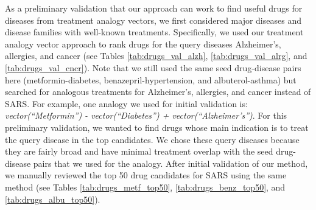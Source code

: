 \documentclass{article}
\begin{document}
As a preliminary validation that our approach can work to find useful drugs for diseases from treatment analogy vectors, we first considered major diseases and disease families with well-known treatments.
Specifically, we used our treatment analogy vector approach to rank drugs for the query diseases Alzheimer's, allergies, and cancer (see Tables \ref{tab:drugs_val_alzh}, \ref{tab:drugs_val_alrg}, and \ref{tab:drugs_val_cncr}).
Note that we still used the same seed drug-disease pairs here (metformin-diabetes, benazepril-hypertension, and albuterol-asthma) but searched for analogous treatments for Alzheimer's, allergies, and cancer instead of SARS.
For example, one analogy we used for initial validation is: \emph{vector(``Metformin'') - vector(``Diabetes'') + vector(``Alzheimer's'')}.
For this preliminary validation, we wanted to find drugs whose main indication is to treat the query disease in the top candidates.
We chose these query diseases because they are fairly broad and have minimal treatment overlap with the seed drug-disease pairs that we used for the analogy.
After initial validation of our method, we manually reviewed the top 50 drug candidates for SARS using the same method (see Tables \ref{tab:drugs_metf_top50}, \ref{tab:drugs_benz_top50}, and \ref{tab:drugs_albu_top50}).
\end{document}
